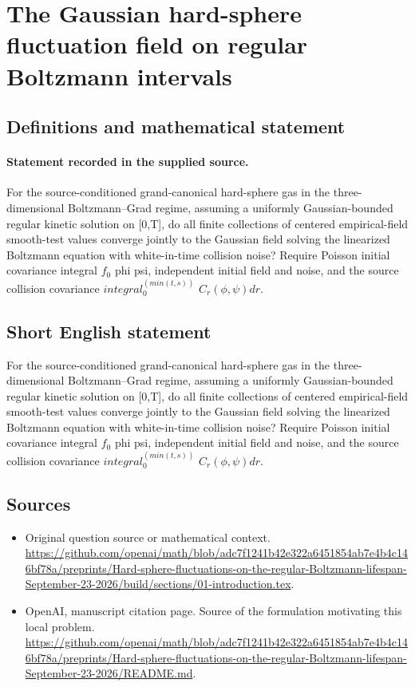\documentclass[11pt]{article}
\begin{document}
\section*{The Gaussian hard-sphere fluctuation field on regular Boltzmann intervals}\label{30007326}
\subsection{Definitions and mathematical statement}
\paragraph{Statement recorded in the supplied source.}
For the source-conditioned grand-canonical hard-sphere gas in the three-dimensional Boltzmann–Grad regime, assuming a uniformly Gaussian-bounded regular kinetic solution on [0,T], do all finite collections of centered empirical-field smooth-test values converge jointly to the Gaussian field solving the linearized Boltzmann equation with white-in-time collision noise? Require Poisson initial covariance integral $f_0$ phi psi, independent initial field and noise, and the source collision covariance $integral_0^(min(t,s))$ $C_r(\phi ,\psi )dr$.
\subsection{Short English statement}
For the source-conditioned grand-canonical hard-sphere gas in the three-dimensional Boltzmann–Grad regime, assuming a uniformly Gaussian-bounded regular kinetic solution on [0,T], do all finite collections of centered empirical-field smooth-test values converge jointly to the Gaussian field solving the linearized Boltzmann equation with white-in-time collision noise? Require Poisson initial covariance integral $f_0$ phi psi, independent initial field and noise, and the source collision covariance $integral_0^(min(t,s))$ $C_r(\phi ,\psi )dr$.
\subsection{Sources}
\begin{itemize}
\item[S1] Original question source or mathematical context.
\url{https://github.com/openai/math/blob/adc7f1241b42e322a6451854ab7e4b4c146bf78a/preprints/Hard-sphere-fluctuations-on-the-regular-Boltzmann-lifespan-September-23-2026/build/sections/01-introduction.tex}.
\item[S2] OpenAI, manuscript citation page. Source of the formulation motivating this local problem.
\url{https://github.com/openai/math/blob/adc7f1241b42e322a6451854ab7e4b4c146bf78a/preprints/Hard-sphere-fluctuations-on-the-regular-Boltzmann-lifespan-September-23-2026/README.md}.
\end{itemize}
\end{document}

